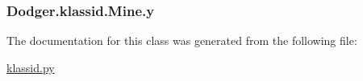 \subsubsection[{y}]{\setlength{\rightskip}{0pt plus 5cm}Dodger.\+klassid.\+Mine.\+y}\label{class_dodger_1_1klassid_1_1_mine_a634b0ff493f5bba0350fc58d09eb040d}


The documentation for this class was generated from the following file\+:\begin{DoxyCompactItemize}
\item 
\hyperlink{klassid_8py}{klassid.\+py}\end{DoxyCompactItemize}
